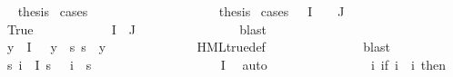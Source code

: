 \begin{isabellebody}
\ \isamarkupfalse%
\ {\isacharquery}{\kern0pt}thesis\ \isamarkupfalse%
{\isacharparenleft}{\kern0pt}cases{\isacharparenright}{\kern0pt}\isanewline
\ \ \ \ \ \ \ \ \isamarkupfalse%
\ {}\isanewline
\ \ \ \ \ \ \ \ \isamarkupfalse%
\ {\isacharquery}{\kern0pt}thesis\ \isamarkupfalse%
{\isacharparenleft}{\kern0pt}cases\ {\isachardoublequoteopen}{\isasymPhi}\ {\isacharbackquote}{\kern0pt}\ I\ {\isasyminter}\ {\isasymPhi}\ {\isacharbackquote}{\kern0pt}\ J\ {\isacharequal}{\kern0pt}\ {\isacharbraceleft}{\kern0pt}{\isacharbraceright}{\kern0pt}{\isachardoublequoteclose}{\isacharparenright}{\kern0pt}\isanewline
\ \ \ \ \ \ \ \ \ \ \isamarkupfalse%
\ True\isanewline
\ \ \ \ \ \ \ \ \ \ \isamarkupfalse%
\ {\isachardoublequoteopen}I\ {\isasyminter}\ J\ {\isacharequal}{\kern0pt}\ {\isacharbraceleft}{\kern0pt}{\isacharbraceright}{\kern0pt}{\isachardoublequoteclose}\isanewline
\ \ \ \ \ \ \ \ \ \ \ \ \isamarkupfalse%
\ blast\isanewline
\ \ \ \ \ \ \ \ \ \ \isamarkupfalse%
\ {}\ \isamarkupfalse%
\ {\isachardoublequoteopen}{\isasymforall}y{\isasymin}{\isasymPhi}\ {\isacharbackquote}{\kern0pt}\ I{\isachardot}{\kern0pt}\ {\isasymphi}\ {\isasymnoteq}\ y\ {\isasymlongrightarrow}\ {\isacharparenleft}{\kern0pt}{\isasymforall}s{\isachardot}{\kern0pt}\ s\ {\isasymTurnstile}\ y{\isacharparenright}{\kern0pt}{\isachardoublequoteclose}\isanewline
\ \ \ \ \ \ \ \ \ \ \ \ \isamarkupfalse%
\ HML{\isacharunderscore}{\kern0pt}true{\isacharunderscore}{\kern0pt}def\ \isanewline
\ \ \ \ \ \ \ \ \ \ \ \ \isamarkupfalse%
\ blast\isanewline
\ \ \ \ \ \ \ \ \ \ \isamarkupfalse%
\ {\isachardoublequoteopen}{\isasymforall}s{\isachardot}{\kern0pt}\ {\isacharparenleft}{\kern0pt}{\isasymforall}i\ {\isasymin}\ I{\isachardot}{\kern0pt}\ s\ {\isasymTurnstile}\ {\isacharparenleft}{\kern0pt}{\isasymPhi}\ i{\isacharparenright}{\kern0pt}{\isacharparenright}{\kern0pt}\ {\isasymlongleftrightarrow}\ s\ {\isasymTurnstile}\ {\isasymphi}{\isachardoublequoteclose}\isanewline
\ \ \ \ \ \ \ \ \ \ \ \ \isamarkupfalse%
\ {\isacartoucheopen}{\isasymphi}\ {\isasymin}\ {\isasymPhi}\ {\isacharbackquote}{\kern0pt}\ I{\isacartoucheclose}\ \isamarkupfalse%
\ auto\isanewline
\ \ \ \ \ \ \ \ \ \ \isamarkupfalse%
\ {\isasymPsi}\ \ {\isachardoublequoteopen}{\isasymPsi}\ {\isasymequiv}\ {\isacharparenleft}{\kern0pt}{\isasymlambda}i{\isachardot}{\kern0pt}\ {\isacharparenleft}{\kern0pt}if\ i\ {\isacharequal}{\kern0pt}\ i{\isacharunderscore}{\kern0pt}{\isasymphi}\ then\ {\isasympsi}\ \isanewline

\end{isabellebody}
